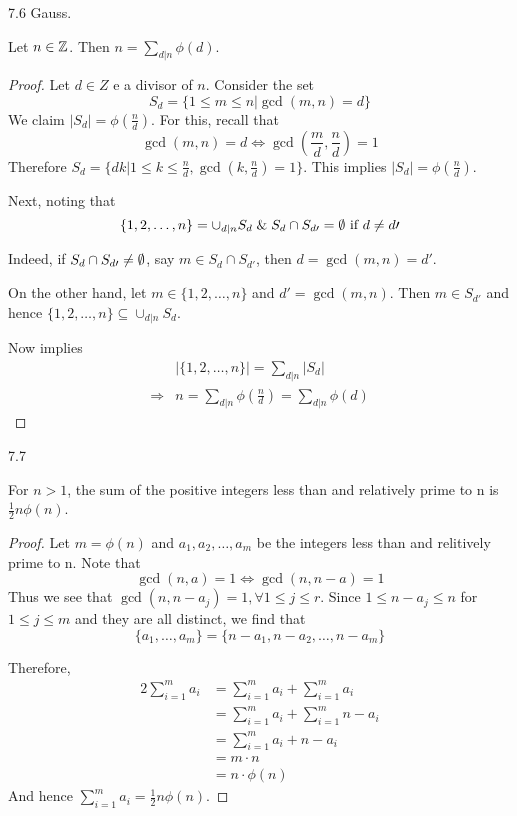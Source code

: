 \begin{theorem}
    7.6 Gauss.

    Let $n \in \mathbb{Z}$. Then $n = \sum_{d | n}^{}\phi(d)$.
\end{theorem}
\begin{proof}
    Let $d \in Z$ e a divisor of $n$. Consider the set
    \[
        S_d = \{ 1 \leq m \leq n | \gcd(m, n) = d \}
    \]
    We claim $|S_d| = \phi(\frac{n}{d})$. For this, recall that
    \[
        \gcd(m, n) = d \iff \gcd(\frac{m}{d}, \frac{n}{d}) = 1
    \]
    Therefore $S_d = \{ dk | 1 \leq k \leq \frac{n}{d}, \gcd(k, \frac{n}{d}) = 1 \}$.\newline
    This implies $|S_d| = \phi(\frac{n}{d})$.

    Next, noting that
    \[
        \{ 1, 2, \dots, n \} = \cup_{d | n} S_d {\And} S_d \cap S_{d\prime} = \O \text{ if } d\neq d\prime
    \]

    Indeed, if $S_d \cap S_{d\prime} \neq \emptyset$, say $m \in S_d \cap S_{d\prime}$, then
    $d = \gcd(m, n) = d\prime$.

    On the other hand, let $m \in \{1, 2, \dots, n\}$ and $d\prime = \gcd(m, n)$.
    Then $m \in S_{d\prime}$ and hence $\{1, 2, \dots, n\} \subseteq \cup_{d | n}S_d$.

    Now implies
    \[
        \begin{aligned}
            &| \{ 1, 2, \dots, n \} | = \sum_{d | n}{ |S_d| } \\
            \Rightarrow &n = \sum_{d|n}^{}{\phi(\frac{n}{d})} = \sum_{d|n}^{}{\phi(d)}
        \end{aligned}
    \]
\end{proof}

\begin{theorem}
    7.7

    For $n > 1$, the sum of the positive integers less than 
    and relatively prime to n is $\frac{1}{2}n\phi(n)$.
\end{theorem}
\begin{proof}
    Let $m = \phi(n)$ and $a_1, a_2, \dots, a_m$ be the integers less than and relitively prime to n.
    Note that
    \[
        \gcd(n, a) = 1 \iff \gcd(n, n-a) = 1
    \]
    Thus we see that $\gcd(n, n-a_j) = 1, \forall 1 \leq j \leq r$.
    Since $1 \leq n-a_j \leq n$ for $1 \leq j \leq m$ and they are all distinct, we find that
    \[
        \{ a_1, \dots, a_m \} = \{ n-a_1, n-a_2, \dots, n-a_m \}
    \]

    Therefore,
    \[
        \begin{aligned}
            2\sum_{i=1}^{m}{a_i} &= \sum_{i=1}^{m}a_i + \sum_{i=1}^{m}a_i \\
            &= \sum_{i=1}^{m}a_i + \sum_{i=1}^{m}{n-a_i} \\
            &= \sum_{i=1}^{m}{a_i + n - a_i} \\
            &= m \cdot n \\
            &= n \cdot \phi(n)
        \end{aligned}
    \]
    And hence $\sum_{i=1}^{m}a_i = \frac{1}{2}n\phi(n)$.
\end{proof}


